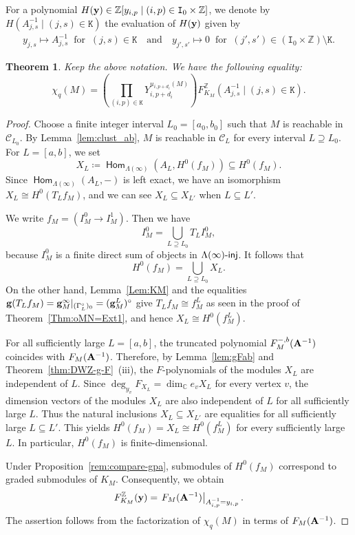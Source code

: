 \documentclass[12pt]{amsart}
\newtheorem{theorem}{Theorem}[section]
\theoremstyle{definition}
\theoremstyle{remark}
\numberwithin{equation}{section}
\newcommand{\opname}[1]{\operatorname{\mathsf{#1}}}
\newcommand{\Hom}{\opname{Hom}}
\newcommand{\injc}{\mathchar`-\mathsf{inj}}
\begin{document}
For a polynomial $H({\bf y})\in \mathbb{Z}[y_{i,p}\mid (i,p)\in \mathtt{I}_0\times \mathbb{Z}]$, we denote by $H(A_{j,s}^{-1}\mid (j,s)\in \mathtt K)$ the evaluation of $H({\bf y})$ given by
\begin{align*}
    y_{j,s}\mapsto A_{j,s}^{-1}\;\; \text{for}\;\;(j,s)\in \mathtt{K}\quad\text{and}\quad y_{j',s'}\mapsto 0\;\;\text{for}\;\;(j',s')\in (\mathtt{I}_0\times \mathbb{Z})\setminus \mathtt{K}.
\end{align*}

\begin{theorem}\label{thm:qchformula}
Keep the above notation. 
We have the following equality:
\[\chi_q(M)= \left( \prod_{(i,p) \in \mathtt K} Y_{i,p+d_i}^{u_{i,p+d_i}(M)} \right)F_{K_M}^{\mathbb{Z}}(A_{j,s}^{-1}\mid (j,s)\in \mathtt K).\]
\end{theorem}
\begin{proof}
    Choose a finite integer interval $L_0=[a_0,b_0]$ such that $M$ is
reachable in $\mathcal C_{L_0}$. By Lemma~\ref{lem:clust_ab}, $M$ is
reachable in $\mathcal C_L$ for every interval $L\supseteq L_0$.
For $L=[a,b]$, we set
\[
X_L\coloneqq \Hom_{\Lambda(\infty)}(A_L, H^0(f_M))\subseteq H^0(f_M).
\]
Since $\Hom_{\Lambda(\infty)}(A_L, -)$ is left exact, we have an isomorphism
$X_L\cong H^0(T_Lf_M)$, and we can see $X_L\subseteq X_{L'}$ when $L\subseteq L'$.

We write $f_M=(I_M^0\to I_M^1)$. Then we have
\[
I_M^0= \bigcup_{L\supseteq L_0}T_LI_M^0,
\]
because $I_M^0$ is a finite direct sum of objects in $\Lambda(\infty)\injc$. It follows that
\[
H^0(f_M)=\bigcup_{L\supseteq L_0}X_L.
\]
On the other hand, Lemma~\ref{Lem:KM} and the equalities ${\bf g}(T_{L}f_M)={\bf g}_M^\infty|_{(\Gamma_{L}^\circ)_0}=({\bf g}_M^{L})^\circ$ give
$T_Lf_M\cong f_M^L$ as seen in the proof of Theorem~\ref{Thm:oMN=Ext1}, and hence
$X_L\cong H^0(f_M^L)$.

For all sufficiently large $L=[a,b]$, the truncated polynomial
$F_M^{-,b}({\bf A}^{-1})$ coincides with
$F_M({\bf A}^{-1})$. Therefore, by
Lemma~\ref{lem:gFab} and Theorem~\ref{thm:DWZ-g-F}~(iii), the
$F$-polynomials of the modules $X_L$ are independent of $L$.
Since $\deg_{y_v}F_{X_L}=\dim_{\mathbb C}e_vX_L$ for every vertex $v$,
the dimension vectors of the modules $X_L$ are also independent of
$L$ for all sufficiently large $L$. Thus the natural inclusions
$X_L\subseteq X_{L'}$ are equalities for all sufficiently large
$L\subseteq L'$. This yields
$H^0(f_M)=X_L\cong H^0(f_M^L)$
for every sufficiently large $L$. In particular, $H^0(f_M)$ is
finite-dimensional.

Under Proposition~\ref{rem:compare-gpa}, submodules of $H^0(f_M)$
correspond to graded submodules of $K_M$. Consequently, we obtain
\[
F_{K_M}^{\mathbb Z}({\bf y})
=
\left.
F_M({\bf A}^{-1})
\right|_{A_{i,p}^{-1}=y_{i,p}}.
\]
The assertion follows from the factorization of
$\chi_q(M)$ in terms of $F_M({\bf A}^{-1})$.
\end{proof}
\end{document}
